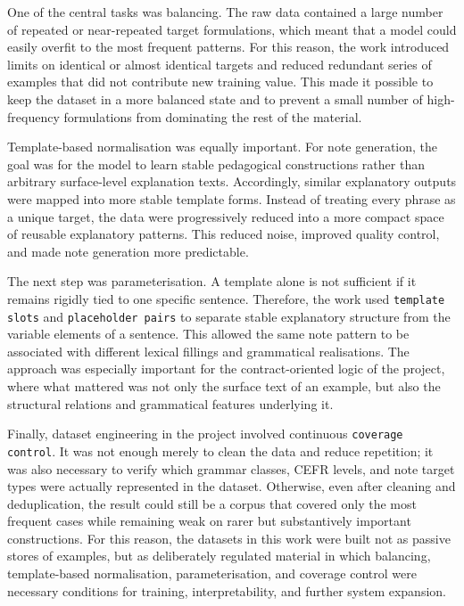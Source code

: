 \documentclass[12pt,a4paper,oneside]{report}
\begin{document}
One of the central tasks was balancing. The raw data contained a large number of repeated or near-repeated target formulations, which meant that a model could easily overfit to the most frequent patterns. For this reason, the work introduced limits on identical or almost identical targets and reduced redundant series of examples that did not contribute new training value. This made it possible to keep the dataset in a more balanced state and to prevent a small number of high-frequency formulations from dominating the rest of the material.

Template-based normalisation was equally important. For note generation, the goal was for the model to learn stable pedagogical constructions rather than arbitrary surface-level explanation texts. Accordingly, similar explanatory outputs were mapped into more stable template forms. Instead of treating every phrase as a unique target, the data were progressively reduced into a more compact space of reusable explanatory patterns. This reduced noise, improved quality control, and made note generation more predictable.

The next step was parameterisation. A template alone is not sufficient if it remains rigidly tied to one specific sentence. Therefore, the work used \texttt{template slots} and \texttt{placeholder pairs} to separate stable explanatory structure from the variable elements of a sentence. This allowed the same note pattern to be associated with different lexical fillings and grammatical realisations. The approach was especially important for the contract-oriented logic of the project, where what mattered was not only the surface text of an example, but also the structural relations and grammatical features underlying it.

Finally, dataset engineering in the project involved continuous \texttt{coverage control}. It was not enough merely to clean the data and reduce repetition; it was also necessary to verify which grammar classes, CEFR levels, and note target types were actually represented in the dataset. Otherwise, even after cleaning and deduplication, the result could still be a corpus that covered only the most frequent cases while remaining weak on rarer but substantively important constructions. For this reason, the datasets in this work were built not as passive stores of examples, but as deliberately regulated material in which balancing, template-based normalisation, parameterisation, and coverage control were necessary conditions for training, interpretability, and further system expansion.
\end{document}
